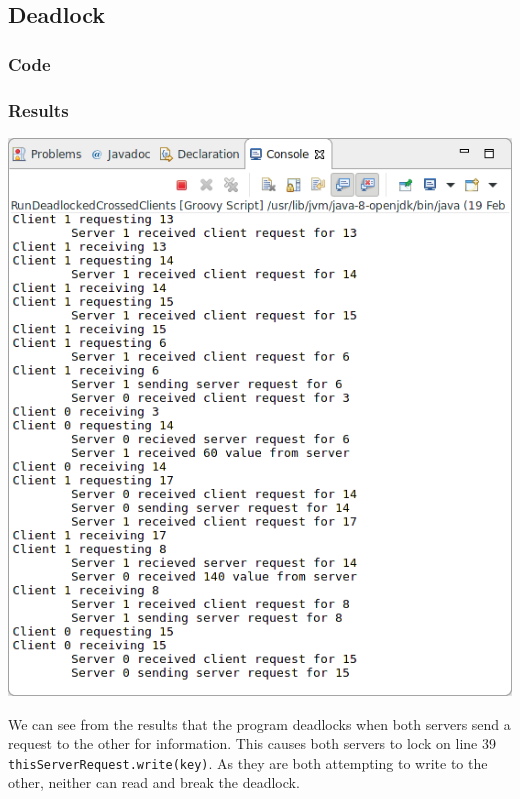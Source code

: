 \subsection{Deadlock}

\subsubsection*{Code}




\subsubsection*{Results}

\includegraphics[width=\textwidth]{img/screenshots/7-1.png}

We can see from the results that the program deadlocks when both servers send a request to the other for information.  This causes both servers to lock on line 39 \texttt{thisServerRequest.write(key)}.  As they are both attempting to write to the other, neither can read and break the deadlock.